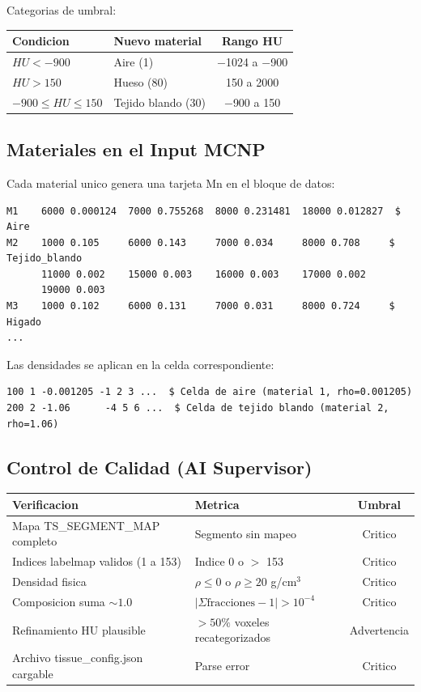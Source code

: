 \documentclass[12pt,a4paper]{article}
\begin{document}
Categorias de umbral:

\begin{center}
\begin{tabular}{llc}
\toprule
\textbf{Condicion} & \textbf{Nuevo material} & \textbf{Rango HU} \\
\midrule
$HU < -900$ & Aire (1) & $-$1024 a $-$900 \\
$HU > 150$ & Hueso (80) & 150 a 2000 \\
$-900 \leq HU \leq 150$ & Tejido blando (30) & $-$900 a 150 \\
\bottomrule
\end{tabular}
\end{center}

\subsection{Materiales en el Input MCNP}

Cada material unico genera una tarjeta Mn en el bloque de datos:

\begin{verbatim}
M1    6000 0.000124  7000 0.755268  8000 0.231481  18000 0.012827  $ Aire
M2    1000 0.105     6000 0.143     7000 0.034     8000 0.708     $ Tejido_blando
      11000 0.002    15000 0.003    16000 0.003    17000 0.002
      19000 0.003
M3    1000 0.102     6000 0.131     7000 0.031     8000 0.724     $ Higado
...
\end{verbatim}

Las densidades se aplican en la celda correspondiente:

\begin{verbatim}
100 1 -0.001205 -1 2 3 ...  $ Celda de aire (material 1, rho=0.001205)
200 2 -1.06      -4 5 6 ...  $ Celda de tejido blando (material 2, rho=1.06)
\end{verbatim}

\subsection{Control de Calidad (AI Supervisor)}

\begin{table}[H]
\centering
\begin{tabular}{llc}
\toprule
\textbf{Verificacion} & \textbf{Metrica} & \textbf{Umbral} \\
\midrule
Mapa TS\_SEGMENT\_MAP completo & Segmento sin mapeo & Critico \\
Indices labelmap validos (1 a 153) & Indice 0 o $>$ 153 & Critico \\
Densidad fisica & $\rho \leq 0$ o $\rho \geq 20$ g/cm$^3$ & Critico \\
Composicion suma $\sim 1.0$ & $|\Sigma \text{fracciones} - 1| > 10^{-4}$ & Critico \\
Refinamiento HU plausible & $> 50\%$ voxeles recategorizados & Advertencia \\
Archivo tissue\_config.json cargable & Parse error & Critico \\
\bottomrule
\end{tabular}
\end{table}
\end{document}

